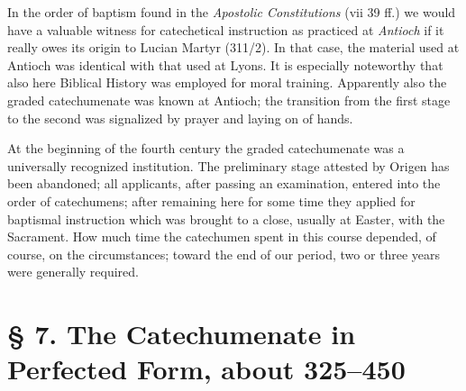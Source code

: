 In the order of baptism found in the \emph{Apostolic Constitutions} (vii 39 ff.) we would have a valuable witness for catechetical instruction as practiced at \emph{Antioch} if it really owes its origin to Lucian Martyr (311/2). In that case, the material used at Antioch was identical with that used at
Lyons. It is especially noteworthy that also here Biblical History was employed for moral training. Apparently also the graded catechumenate was known at Antioch; the transition from the first stage to the second was signalized by prayer and laying on of hands.

At the beginning of the fourth century the graded catechumenate was a universally recognized institution. The preliminary stage attested by Origen has been abandoned; all applicants, after passing an examination, entered into the order of catechumens; after remaining here for some time they applied for baptismal instruction which was brought to a close, usually at Easter, with the Sacrament. How much time the catechumen spent in this course depended, of course, on the circumstances; toward the end of our period, two or three years were generally required.

\section[§ 7. The Catechumenate in Perfected Form]{§ 7. The Catechumenate in Perfected Form, about 325–450}

